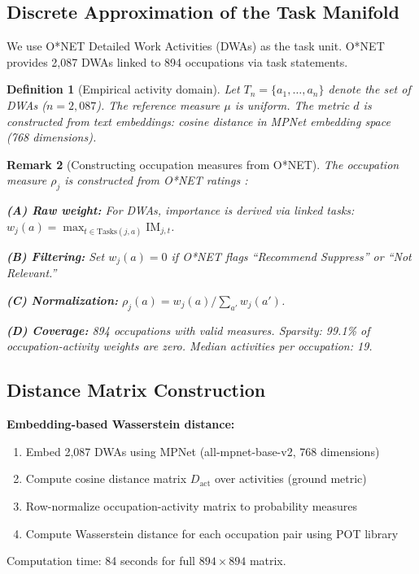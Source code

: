 \documentclass[12pt]{article}
\newtheorem{definition}{Definition}[section]
\newtheorem{remark}[definition]{Remark}
\begin{document}
\subsection{Discrete Approximation of the Task Manifold}
\label{subsec:discrete-approx}


We use O*NET Detailed Work Activities (DWAs) as the task unit. O*NET provides 2,087 DWAs linked to 894 occupations via task statements.


\begin{definition}[Empirical activity domain]
\label{def:empirical-activity-domain}
Let $T_n = \{a_1, \ldots, a_n\}$ denote the set of DWAs ($n = 2{,}087$). The reference measure $\mu$ is uniform. The metric $d$ is constructed from text embeddings: cosine distance in MPNet embedding space (768 dimensions).
\end{definition}


\begin{remark}[Constructing occupation measures from O*NET]
\label{rem:rho-construction}
The occupation measure $\rho_j$ is constructed from O*NET ratings \citep{onet2024dwa,onet2024scales}:

\textbf{(A) Raw weight:} For DWAs, importance is derived via linked tasks: $w_j(a) = \max_{t \in \mathrm{Tasks}(j,a)} \mathrm{IM}_{j,t}$.

\textbf{(B) Filtering:} Set $w_j(a) = 0$ if O*NET flags ``Recommend Suppress'' or ``Not Relevant.''

\textbf{(C) Normalization:} $\rho_j(a) = w_j(a) / \sum_{a'} w_j(a')$.

\textbf{(D) Coverage:} 894 occupations with valid measures. Sparsity: 99.1\% of occupation-activity weights are zero. Median activities per occupation: 19.
\end{remark}


\subsection{Distance Matrix Construction}
\label{subsec:distance-construction}


\textbf{Embedding-based Wasserstein distance:}
\begin{enumerate}
    \item Embed 2,087 DWAs using MPNet (all-mpnet-base-v2, 768 dimensions)
    \item Compute cosine distance matrix $D_{\mathrm{act}}$ over activities (ground metric)
    \item Row-normalize occupation-activity matrix to probability measures
    \item Compute Wasserstein distance for each occupation pair using POT library
\end{enumerate}
Computation time: 84 seconds for full $894 \times 894$ matrix.
\end{document}
